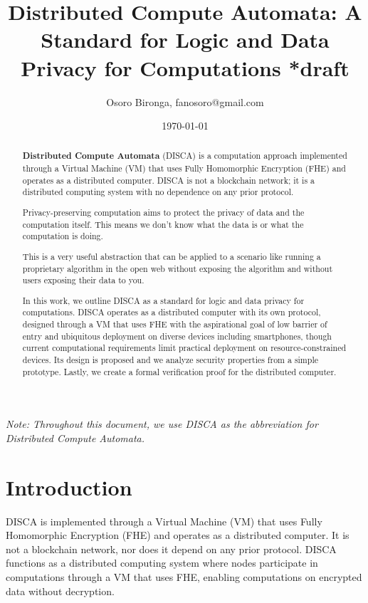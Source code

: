 \documentclass[12pt,a4paper]{article}
\title{Distributed Compute Automata: A Standard for Logic and Data Privacy for Computations *draft}
\author{Osoro Bironga, fanosoro@gmail.com}
\date{\today}
\begin{document}
\maketitle

\begin{abstract}
\centering
\begin{minipage}{0.8\textwidth}
\centering
\textbf{Distributed Compute Automata} (DISCA) is a computation approach implemented through a Virtual Machine (VM) that uses Fully Homomorphic Encryption (FHE) and operates as a distributed computer.
DISCA is not a blockchain network; it is a distributed computing system with no dependence on any prior protocol.

Privacy-preserving computation aims to protect the privacy of data and the computation itself. This means we don't know what the data is or what the computation is doing. 

This is a very useful abstraction that can be applied to a scenario like running a proprietary algorithm in the open web without exposing the algorithm and without users exposing their data to you.

In this work, we outline DISCA as a standard for logic and data privacy for computations.
DISCA operates as a distributed computer with its own protocol, designed through a VM that uses FHE with the aspirational goal of low barrier of entry and ubiquitous deployment on diverse devices including smartphones, though current computational requirements limit practical deployment on resource-constrained devices.
Its design is proposed and we analyze security properties from a simple prototype.
Lastly, we create a formal verification proof for the distributed computer.
\end{minipage}
\end{abstract}

\noindent\textit{Note: Throughout this document, we use DISCA as the abbreviation for Distributed Compute Automata.}

\section{Introduction}

DISCA is implemented through a Virtual Machine (VM) that uses Fully Homomorphic Encryption (FHE) and operates as a distributed computer.
It is not a blockchain network, nor does it depend on any prior protocol.
DISCA functions as a distributed computing system where nodes participate in computations through a VM that uses FHE, enabling computations on encrypted data without decryption.
\end{document}
